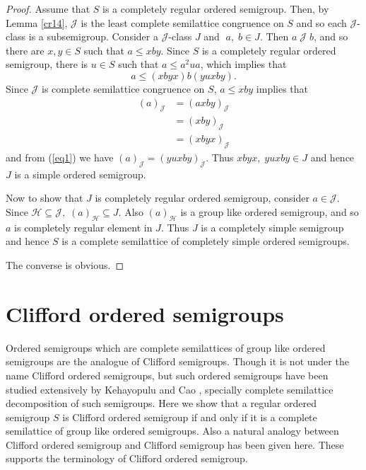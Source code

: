 \documentclass[13pt]{article}
\theoremstyle{definition}
\theoremstyle{remark}
\numberwithin{equation}{section}
\newcommand{\hc}{\mathcal{H}}
\newcommand{\jc}{\mathcal{J}}
\begin{document}
\begin{proof}
Assume  that $S$ is a completely regular ordered semigroup. Then, by
Lemma \ref{cr14}, $\jc$ is the least complete semilattice congruence
on $S$ and so each $\jc$-class is a subsemigroup. Consider a
$\jc$-class $J$ and  $\;a, \;b \in J$. Then $a \;\jc \;b$, and so
there are $x, y \in S$ such that $a \leq xby$. Since $S$ is a
completely regular ordered semigroup, there is $u \in S$ such that
$a \leq a^2ua$, which implies that
\begin{equation}\label{eq1}
a \leq (xbyx) b (yuxby).
\end{equation}
Since $\jc$ is  complete semilattice  congruence on $S$, $a \leq
xby$ implies that
\begin{align*}
(a)_{\jc} &= (axby)_{\jc}\\
          & = (xby)_{\jc}\\
          &= (xbyx)_{\jc}
\end{align*}
and  from   (\ref{eq1}) we have
 $(a)_{\jc}= (yuxby)_{\jc}$. Thus
 $xbyx, \;yuxby \in J$ and hence  $J$ is a simple ordered semigroup.

Now to show that $J $ is completely regular ordered semigroup,
consider  $a \in \jc$. Since $\hc \subseteq \jc, \;(a)_{\hc}
\subseteq J$. Also $(a)_{\hc}$ is a group like ordered semigroup,
and so $a$ is completely regular element in $J$. Thus $J$ is a
completely simple semigroup and hence $S$ is a complete semilattice
of completely simple ordered semigroups.

The converse is obvious.
\end{proof}











\section{Clifford ordered semigroups}
Ordered  semigroups which are complete semilattices of group like
ordered semigroups are the analogue of Clifford semigroups. Though
it is not under the name Clifford ordered semigroups, but such
ordered semigroups have been studied extensively by  Kehayopulu
\cite{Ke MJ 92} and Cao \cite{CX2000} \cite{Cao2000}, specially
complete semilattice decomposition of such semigroups. Here we show
that a regular ordered semigroup $S$ is Clifford ordered semigroup
if and only if it is a complete semilattice of group like ordered
semigroups. Also a natural analogy between Clifford ordered
semigroup and Clifford semigroup has been given here. These supports
the terminology of Clifford ordered semigroup.
\end{document}
